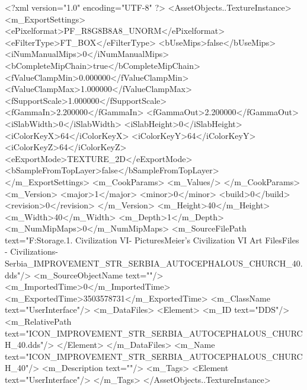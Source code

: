 <?xml version="1.0" encoding="UTF-8" ?>
<AssetObjects..TextureInstance>
	<m_ExportSettings>
		<ePixelformat>PF_R8G8B8A8_UNORM</ePixelformat>
		<eFilterType>FT_BOX</eFilterType>
		<bUseMips>false</bUseMips>
		<iNumManualMips>0</iNumManualMips>
		<bCompleteMipChain>true</bCompleteMipChain>
		<fValueClampMin>0.000000</fValueClampMin>
		<fValueClampMax>1.000000</fValueClampMax>
		<fSupportScale>1.000000</fSupportScale>
		<fGammaIn>2.200000</fGammaIn>
		<fGammaOut>2.200000</fGammaOut>
		<iSlabWidth>0</iSlabWidth>
		<iSlabHeight>0</iSlabHeight>
		<iColorKeyX>64</iColorKeyX>
		<iColorKeyY>64</iColorKeyY>
		<iColorKeyZ>64</iColorKeyZ>
		<eExportMode>TEXTURE_2D</eExportMode>
		<bSampleFromTopLayer>false</bSampleFromTopLayer>
	</m_ExportSettings>
	<m_CookParams>
		<m_Values/>
	</m_CookParams>
	<m_Version>
		<major>1</major>
		<minor>0</minor>
		<build>0</build>
		<revision>0</revision>
	</m_Version>
	<m_Height>40</m_Height>
	<m_Width>40</m_Width>
	<m_Depth>1</m_Depth>
	<m_NumMipMaps>0</m_NumMipMaps>
	<m_SourceFilePath text="F:\Mod Storage\2.1. Civilization VI\Mods\Archive - Pictures\Sid Meier's Civilization VI Art Files\Art Files - Civilizations\Civilization - Serbia\ICON_IMPROVEMENT_STR_SERBIA_AUTOCEPHALOUS_CHURCH_40.dds"/>
	<m_SourceObjectName text=""/>
	<m_ImportedTime>0</m_ImportedTime>
	<m_ExportedTime>3503578731</m_ExportedTime>
	<m_ClassName text="UserInterface"/>
	<m_DataFiles>
		<Element>
			<m_ID text="DDS"/>
			<m_RelativePath text="ICON_IMPROVEMENT_STR_SERBIA_AUTOCEPHALOUS_CHURCH_40.dds"/>
		</Element>
	</m_DataFiles>
	<m_Name text="ICON_IMPROVEMENT_STR_SERBIA_AUTOCEPHALOUS_CHURCH_40"/>
	<m_Description text=""/>
	<m_Tags>
		<Element text="UserInterface"/>
	</m_Tags>
</AssetObjects..TextureInstance>

